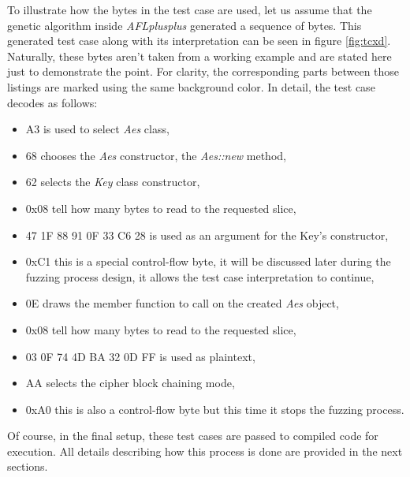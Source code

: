 To illustrate how the bytes in the test case are used, let us assume that the genetic algorithm inside \textit{AFLplusplus} generated a sequence of bytes. 
This generated test case along with its interpretation can be seen in figure \ref{fig:tcxd}. Naturally, these bytes aren't taken from a working example and are stated here just to demonstrate the point.
For clarity, the corresponding parts between those listings are marked using the same background color. In detail, the test case decodes as follows:
\begin{itemize}
    \item \colorbox{red!60}{A3} is used to select \textit{Aes} class,
    \item \colorbox{orange!30}{68} chooses the \textit{Aes} constructor, the \textit{Aes::new} method,
    \item \colorbox{blue!30}{62} selects the \textit{Key} class constructor,
    \item \colorbox{green!75}{0x08} tell how many bytes to read to the requested slice,
    \item \colorbox{green!60}{47 1F 88 91 0F 33 C6 28} is used as an argument for the Key's constructor,
    \item \colorbox{brown!30}{0xC1} this is a special control-flow byte, it will be discussed later during the fuzzing process design, it allows the test case interpretation to continue,
    \item \colorbox{purple!30}{0E} draws the member function to call on the created \textit{Aes} object,
    \item \colorbox{black!45}{0x08} tell how many bytes to read to the requested slice,
    \item \colorbox{black!30}{03 0F 74 4D BA 32 0D FF} is used as plaintext,
    \item \colorbox{yellow!60}{AA} selects the cipher block chaining mode,
    \item \colorbox{brown!60}{0xA0} this is also a control-flow byte but this time it stops the fuzzing process.
\end{itemize}
Of course, in the final setup, these test cases are passed to compiled code for execution. All details describing how this process is done are provided in the next sections. 

